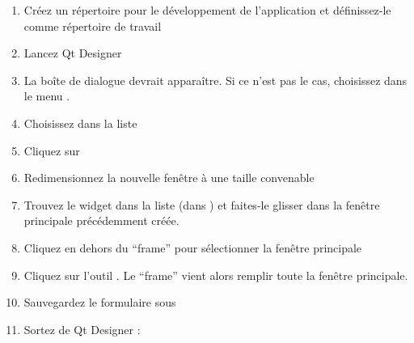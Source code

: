 \begin{enumerate}
\item Créez un répertoire pour le développement de l'application et définissez-le comme répertoire de travail
\item Lancez Qt Designer
\item La boîte de dialogue  devrait apparaître. Si ce n'est pas le cas, choisissez  dans le menu .
\item Choisissez  dans la liste 
\item Cliquez sur  
\item Redimensionnez la nouvelle fenêtre à une taille convenable
\item Trouvez le widget  dans la liste (dans ) et faites-le glisser dans la fenêtre principale précédemment créée.
\item Cliquez en dehors du ``frame'' pour sélectionner la fenêtre principale 
\item Cliquez sur l'outil . Le ``frame'' vient alors remplir toute la fenêtre principale.
\item Sauvegardez le formulaire sous  
\item Sortez de Qt Designer : 
\end{enumerate} 

